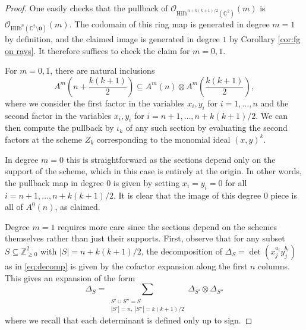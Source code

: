 \documentclass[12pt]{amsart}
\newcommand{\Hilb}{\mathrm{Hilb}}
\newcommand{\C}{\mathbb{C}}
\newcommand{\Z}{\mathbb{Z}}
\newcommand{\CO}{\mathcal{O}}
\numberwithin{equation}{section}
\theoremstyle{definition}
\begin{document}
\begin{proof}
    One easily checks that the pullback of $\CO_{\Hilb^{n+k(k+1)/2}(\C^2)}(m)$ is $\CO_{\Hilb^{n}(\C^2\setminus\mathbf{0})}(m)$. 
    The codomain of this ring map is generated in degree $m=1$ by definition, and the claimed image is generated in degree $1$ by Corollary \ref{cor:fg on rays}. It therefore suffices to check the claim for $m=0,1$.

    For $m=0,1$, there are natural inclusions
    \begin{equation}\label{eq:decomp}
        A^m\left(n+\frac{k(k+1)}{2}\right) \subseteq A^m(n)\otimes A^m\left(\frac{k(k+1)}{2}\right), 
    \end{equation} 
    where we consider the first factor in the variables $x_i,y_i$ for $i=1,\dots,n$ and the second factor in the variables $x_i,y_i$ for $i=n+1,\dots,n+k(k+1)/2$. We can then compute the pullback by $\iota_k$ of any such section by evaluating the second factors at the scheme $Z_k$ corresponding to the monomial ideal $(x,y)^k$.

    In degree $m=0$ this is straightforward as the sections depend only on the support of the scheme, which in this case is entirely at the origin. In other words, the pullback map in degree $0$ is given by setting $x_i=y_i=0$ for all $i=n+1,\dots,n+k(k+1)/2$. It is clear that the image of this degree $0$ piece is all of $A^0(n)$, as claimed.

    Degree $m=1$ requires more care since the sections depend on the schemes themselves rather than just their supports. First, observe that for any subset $S\subseteq \Z^2_{\geq 0}$ with $|S| = n+k(k+1)/2$, the decomposition of $\Delta_S = \det (x_j^{a_i}y_j^{b_i})$ as in \eqref{eq:decomp} is given by the cofactor expansion along the first $n$ columns. This gives an expansion of the form
    \[ \Delta_S = \sum_{\substack{S'\sqcup S'' = S\\ |S'| = n, \, |S''| = k(k+1)/2}} \Delta_{S'} \otimes \Delta_{S''} \]
    where we recall that each determinant is defined only up to sign. 


\end{proof}
\end{document}
